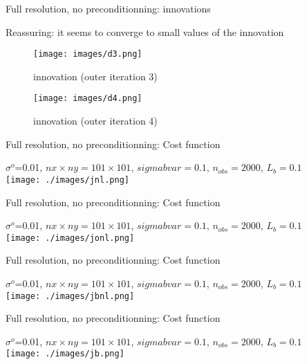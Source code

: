 \documentclass[francais]{beamer}
\begin{document}
\begin{frame}{Full resolution, no preconditionning: innovations}
\begin{center}
Reassuring: it seems to converge to small values of the innovation
\begin{figure}
  \texttt{[image: images/d3.png]}
  \caption{innovation (outer iteration 3)}
\endminipage \hfill
{}%
  \texttt{[image: images/d4.png]}
  \caption{innovation (outer iteration 4)}
\endminipage
\end{figure}
\end{center}
\end{frame}



\begin{frame}{Full resolution, no preconditionning: Cost function}
\begin{center}
$\sigma^o$=0.01, $nx\times ny=101 \times 101$, $sigmabvar=0.1$, $n_{obs}=2000$, $L_b=0.1$\\
 \texttt{[image: ./images/jnl.png]}
\end{center}
\end{frame}

\begin{frame}{Full resolution, no preconditionning: Cost function}
\begin{center}
$\sigma^o$=0.01, $nx\times ny=101 \times 101$, $sigmabvar=0.1$, $n_{obs}=2000$, $L_b=0.1$\\
 \texttt{[image: ./images/jonl.png]}
\end{center}
\end{frame}

\begin{frame}{Full resolution, no preconditionning: Cost function}
\begin{center}
$\sigma^o$=0.01, $nx\times ny=101 \times 101$, $sigmabvar=0.1$, $n_{obs}=2000$, $L_b=0.1$\\
 \texttt{[image: ./images/jbnl.png]}
\end{center}
\end{frame}

\begin{frame}{Full resolution, no preconditionning: Cost function}
\begin{center}
$\sigma^o$=0.01, $nx\times ny=101 \times 101$, $sigmabvar=0.1$, $n_{obs}=2000$, $L_b=0.1$\\
 \texttt{[image: ./images/jb.png]}
\end{center}
\end{frame}
\end{document}
